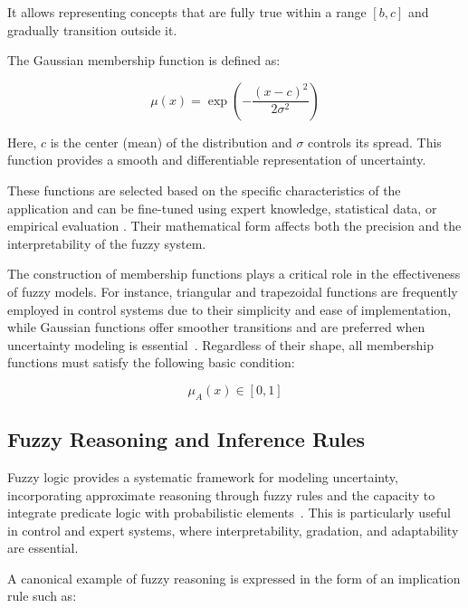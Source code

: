 It allows representing concepts that are fully true within a range $[b, c]$ and gradually transition outside it.

The Gaussian membership function is defined as:

\begin{equation}
\mu(x) = \exp\left( -\frac{(x - c)^2}{2\sigma^2} \right)
\label{eq:gaussian-mf}
\end{equation}

Here, $c$ is the center (mean) of the distribution and $\sigma$ controls its spread. This function provides a smooth and differentiable representation of uncertainty.

These functions are selected based on the specific characteristics of the application and can be fine-tuned using expert knowledge, statistical data, or empirical evaluation \parencite{sadollah2018introductory, dombi2021modifiers, pedrycz2015designing}. Their mathematical form affects both the precision and the interpretability of the fuzzy system.

The construction of membership functions plays a critical role in the effectiveness of fuzzy models. For instance, triangular and trapezoidal functions are frequently employed in control systems due to their simplicity and ease of implementation, while Gaussian functions offer smoother transitions and are preferred when uncertainty modeling is essential~\parencite{sadollah2018introductory, dombi2021modifiers}. Regardless of their shape, all membership functions must satisfy the following basic condition:

\begin{equation}
\mu_A(x) \in [0, 1]
\label{eq:membership-bound}
\end{equation}



\subsection{Fuzzy Reasoning and Inference Rules}
Fuzzy logic provides a systematic framework for modeling uncertainty, incorporating approximate reasoning through fuzzy rules and the capacity to integrate predicate logic with probabilistic elements~\parencite{zadeh1992knowledge, mendel1995fuzzy}. This is particularly useful in control and expert systems, where interpretability, gradation, and adaptability are essential.

A canonical example of fuzzy reasoning is expressed in the form of an implication rule such as:

